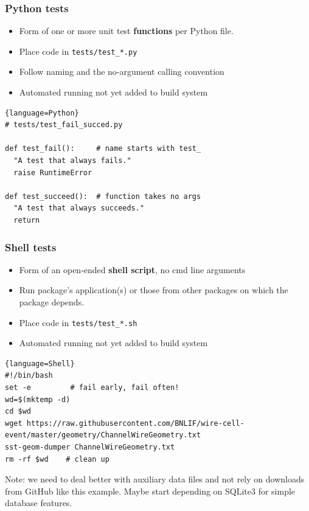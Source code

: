 \documentclass[xcolor=dvipsnames]{beamer}
\begin{document}
\begin{frame}[fragile]
  \frametitle{Python tests}
  \begin{itemize}
  \item Form of one or more unit test \textbf{functions} per Python file.
  \item Place code in \texttt{tests/test\_*.py}
  \item Follow naming and the no-argument calling convention
  \item Automated running not yet added to build system
  \end{itemize}
  
 \begin{lstlisting}{language=Python}
# tests/test_fail_succed.py

def test_fail():     # name starts with test_ 
  "A test that always fails."
  raise RuntimeError

def test_succeed():  # function takes no args
  "A test that always succeeds."
  return
 \end{lstlisting}

\end{frame}

\begin{frame}[fragile]
  \frametitle{Shell tests}
  \begin{itemize}
  \item Form of an open-ended \textbf{shell script}, no cmd line arguments
  \item Run package's application(s) or those from other packages on
    which the package depends.
  \item Place code in \texttt{tests/test\_*.sh}
  \item Automated running not yet added to build system
  \end{itemize}
  
 \begin{lstlisting}{language=Shell}
#!/bin/bash
set -e         # fail early, fail often!
wd=$(mktemp -d)
cd $wd 
wget https://raw.githubusercontent.com/BNLIF/wire-cell-event/master/geometry/ChannelWireGeometry.txt
sst-geom-dumper ChannelWireGeometry.txt
rm -rf $wd    # clean up
 \end{lstlisting}
 \footnotesize
 Note: we need to deal better with auxiliary data files and not rely
 on downloads from GitHub like this example.
 Maybe start depending on SQLite3 for simple database features.

\end{frame}
\end{document}
